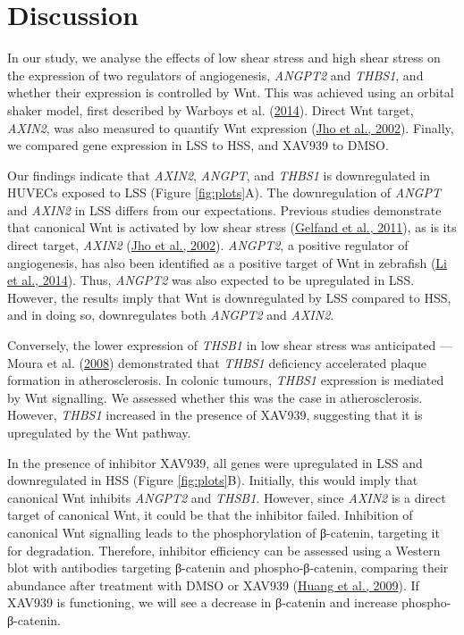 \documentclass[
  11pt,
]{article}
\begin{document}
\hypertarget{discussion}{%
\section{Discussion}\label{discussion}}

In our study, we analyse the effects of low shear stress and high shear stress on the expression of two regulators of angiogenesis, \emph{ANGPT2} and \emph{THBS1}, and whether their expression is controlled by Wnt.
This was achieved using an orbital shaker model, first described by Warboys et al. (\protect\hyperlink{ref-Warboys2014}{2014}).
Direct Wnt target, \emph{AXIN2}, was also measured to quantify Wnt expression (\protect\hyperlink{ref-Jho2002}{Jho et al., 2002}).
Finally, we compared gene expression in LSS to HSS, and XAV939 to DMSO.

Our findings indicate that \emph{AXIN2}, \emph{ANGPT}, and \emph{THBS1} is downregulated in HUVECs exposed to LSS (Figure \ref{fig:plots}A).
The downregulation of \emph{ANGPT} and \emph{AXIN2} in LSS differs from our expectations.
Previous studies demonstrate that canonical Wnt is activated by low shear stress (\protect\hyperlink{ref-Gelfand2011}{Gelfand et al., 2011}), as is its direct target, \emph{AXIN2} (\protect\hyperlink{ref-Jho2002}{Jho et al., 2002}).
\emph{ANGPT2}, a positive regulator of angiogenesis, has also been identified as a positive target of Wnt in zebrafish (\protect\hyperlink{ref-Li2014-mx}{Li et al., 2014}).
Thus, \emph{ANGPT2} was also expected to be upregulated in LSS.
However, the results imply that Wnt is downregulated by LSS compared to HSS, and in doing so, downregulates both \emph{ANGPT2} and \emph{AXIN2}.

Conversely, the lower expression of \emph{THSB1} in low shear stress was anticipated --- Moura et al. (\protect\hyperlink{ref-Moura2008}{2008}) demonstrated that \emph{THBS1} deficiency accelerated plaque formation in atherosclerosis.
In colonic tumours, \emph{THBS1} expression is mediated by Wnt signalling.
We assessed whether this was the case in atherosclerosis.
However, \emph{THBS1} increased in the presence of XAV939, suggesting that it is upregulated by the Wnt pathway.

In the presence of inhibitor XAV939, all genes were upregulated in LSS and downregulated in HSS (Figure \ref{fig:plots}B).
Initially, this would imply that canonical Wnt inhibits \emph{ANGPT2} and \emph{THSB1}.
However, since \emph{AXIN2} is a direct target of canonical Wnt, it could be that the inhibitor failed.
Inhibition of canonical Wnt signalling leads to the phosphorylation of β-catenin, targeting it for degradation.
Therefore, inhibitor efficiency can be assessed using a Western blot with antibodies targeting β-catenin and phospho-β-catenin, comparing their abundance after treatment with DMSO or XAV939 (\protect\hyperlink{ref-Huang2009}{Huang et al., 2009}).
If XAV939 is functioning, we will see a decrease in β-catenin and increase phospho-β-catenin.
\end{document}

